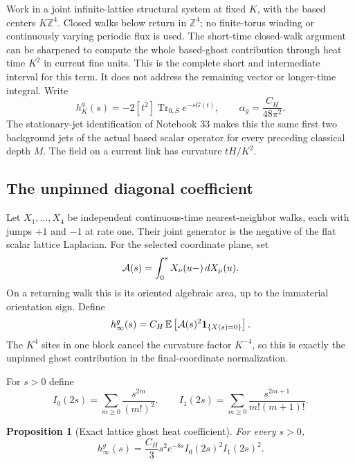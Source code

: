 \documentclass[11pt]{article}
\newtheorem{proposition}[theorem]{Proposition}
\theoremstyle{remark}
\begin{document}
Work in a joint infinite-lattice structural system at fixed
\(K\), with the based centers \(K\mathbb Z^4\). Closed walks
below return in \(\mathbb Z^4\); no finite-torus winding
or continuously varying periodic flux is used.
The short-time closed-walk argument can be sharpened to
compute the whole based-ghost contribution through heat
time \(K^2\) in current fine units. This is the complete
short and intermediate interval for this term. It does
not address the remaining vector or longer-time integral.
Write
\[
 h_K^g(s)=-2[t^2]\operatorname{Tr}_{0,S}e^{-sG(t)},\qquad
 \alpha_g=\frac{C_H}{48\pi^2}.
\]
The stationary-jet identification of Notebook 33 makes
this the same first two background jets of the actual
based scalar operator for every
preceding classical depth \(M\). The field on a current
link has curvature \(tH/K^2\).

\subsection{The unpinned diagonal coefficient}
\label{pgp-unpinned-section}

Let \(X_1,\ldots,X_4\) be independent continuous-time
nearest-neighbor walks, each with jumps \(+1\) and
\(-1\) at rate one. Their joint generator is the
negative of the flat scalar lattice Laplacian.
For the selected coordinate plane, set
\[
 {\cal A}(s)=\int_0^s X_\nu(u-)\,dX_\mu(u).
\]
On a returning walk this is its oriented algebraic
area, up to the immaterial orientation sign. Define
\begin{equation}
 h_\infty^g(s)
   =C_H\,\mathbb E\left[{\cal A}(s)^2
                       {\bf1}_{\{X(s)=0\}}\right].
 \label{pgp-unpinned-definition}
\end{equation}
The \(K^4\) sites in one block cancel the curvature
factor \(K^{-4}\), so this is exactly the unpinned
ghost contribution in the final-coordinate normalization.

For \(s>0\) define
\[
 I_0(2s)=\sum_{m\ge0}\frac{s^{2m}}{(m!)^2},\qquad
 I_1(2s)=\sum_{m\ge0}\frac{s^{2m+1}}{m!(m+1)!}.
\]

\begin{proposition}[Exact lattice ghost heat coefficient]
\label{pgp-exact-heat}
For every \(s>0\),
\begin{equation}
 h_\infty^g(s)=\frac{C_H}{3}s^2e^{-8s}
                                  I_0(2s)^2I_1(2s)^2.
 \label{pgp-bessel}
\end{equation}
\end{proposition}
\end{document}
